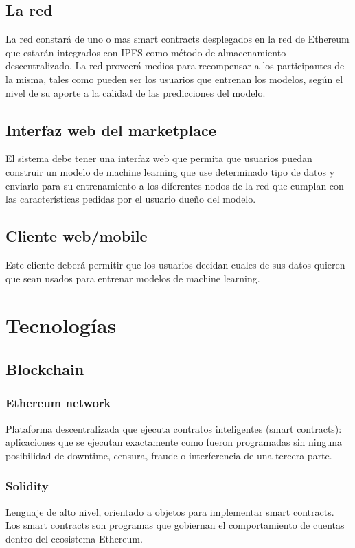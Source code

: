 \documentclass[
11pt, %
oneside, %
spanish, %
singlespacing, %
headsepline, %
chapterinoneline, %
]{MastersDoctoralThesis} %
\begin{document}
\section{La red}
La red constará de uno o mas smart contracts desplegados en la red de Ethereum que estarán integrados con IPFS como método de almacenamiento descentralizado.
La red proveerá medios para recompensar a los participantes de la misma, tales como pueden ser los usuarios que entrenan los modelos, según el nivel de su aporte a la calidad de las predicciones del modelo.

\section{Interfaz web del marketplace}
El sistema debe tener una interfaz web que permita que usuarios puedan construir un modelo de machine learning que use determinado tipo de datos y enviarlo para su entrenamiento a los diferentes nodos de la red que cumplan con las características pedidas por el usuario dueño del modelo.

\section{Cliente web/mobile}
Este cliente deberá permitir que los usuarios decidan cuales de sus datos quieren que sean usados para entrenar modelos de machine learning.

\chapter{Tecnolog\'ias}

\section{Blockchain}

\subsection{Ethereum network \cite{eth}}
Plataforma descentralizada que ejecuta contratos inteligentes (smart contracts): aplicaciones que se ejecutan exactamente como fueron programadas sin ninguna posibilidad de downtime, censura, fraude o interferencia de una tercera parte.

\subsection{Solidity \cite{sol}}
Lenguaje de alto nivel, orientado a objetos para implementar smart contracts. Los smart contracts son programas que gobiernan el comportamiento de cuentas dentro del ecosistema Ethereum.
\end{document}

